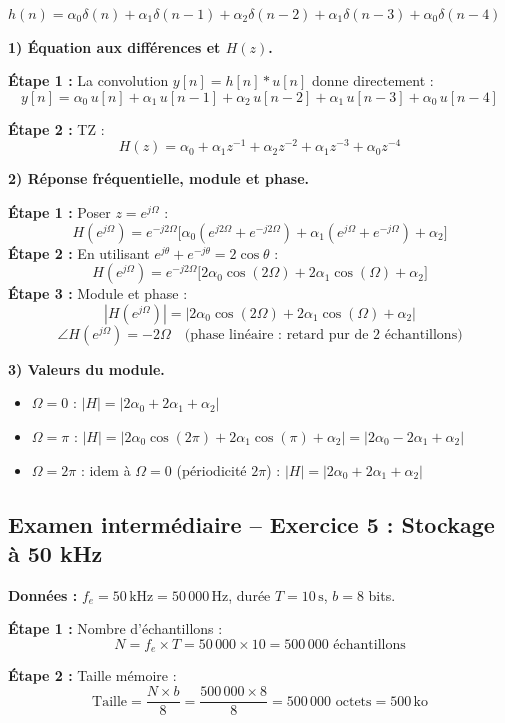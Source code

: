 \documentclass[12pt,a4paper]{article}
\newcommand{\step}[1]{\textcolor{coursbleu}{\textbf{Étape #1 :}}}
\begin{document}
\begin{tcolorbox}[corrbox, title=Correction Exercice 2 -- Filtre FIR symétrique]
$h(n) = \alpha_0\delta(n) + \alpha_1\delta(n-1) + \alpha_2\delta(n-2) + \alpha_1\delta(n-3) + \alpha_0\delta(n-4)$

\bigskip
\textbf{1) Équation aux différences et $H(z)$.}

\step{1} La convolution $y[n] = h[n] * u[n]$ donne directement :
\[
  y[n] = \alpha_0\,u[n] + \alpha_1\,u[n-1] + \alpha_2\,u[n-2] + \alpha_1\,u[n-3] + \alpha_0\,u[n-4]
\]

\step{2} TZ :
\[
  H(z) = \alpha_0 + \alpha_1 z^{-1} + \alpha_2 z^{-2} + \alpha_1 z^{-3} + \alpha_0 z^{-4}
\]

\bigskip
\textbf{2) Réponse fréquentielle, module et phase.}

\step{1} Poser $z = e^{j\Omega}$ :
\[
  H(e^{j\Omega}) = e^{-j2\Omega}\bigl[\alpha_0(e^{j2\Omega}+e^{-j2\Omega})
                  + \alpha_1(e^{j\Omega}+e^{-j\Omega}) + \alpha_2\bigr]
\]
\step{2} En utilisant $e^{j\theta}+e^{-j\theta} = 2\cos\theta$ :
\[
  H(e^{j\Omega}) = e^{-j2\Omega}\bigl[2\alpha_0\cos(2\Omega) + 2\alpha_1\cos(\Omega) + \alpha_2\bigr]
\]
\step{3} Module et phase :
\[
  |H(e^{j\Omega})| = \left|2\alpha_0\cos(2\Omega) + 2\alpha_1\cos(\Omega) + \alpha_2\right|
\]
\[
  \angle H(e^{j\Omega}) = -2\Omega \quad \text{(phase linéaire : retard pur de 2 échantillons)}
\]

\bigskip
\textbf{3) Valeurs du module.}

\begin{itemize}
  \item $\Omega = 0$ : $|H| = |2\alpha_0 + 2\alpha_1 + \alpha_2|$
  \item $\Omega = \pi$ : $|H| = |2\alpha_0\cos(2\pi) + 2\alpha_1\cos(\pi) + \alpha_2|
                              = |2\alpha_0 - 2\alpha_1 + \alpha_2|$
  \item $\Omega = 2\pi$ : idem à $\Omega = 0$ (périodicité $2\pi$) :
        $|H| = |2\alpha_0 + 2\alpha_1 + \alpha_2|$
\end{itemize}
\end{tcolorbox}

\subsection{Examen intermédiaire -- Exercice 5 : Stockage à 50 kHz}

\begin{tcolorbox}[corrbox, title=Correction Exercice 5]
\textbf{Données :} $f_e = 50\,\text{kHz} = 50\,000\,\text{Hz}$, durée $T = 10\,\text{s}$, $b = 8$ bits.

\step{1} Nombre d'échantillons :
\[
  N = f_e \times T = 50\,000 \times 10 = 500\,000 \text{ échantillons}
\]

\step{2} Taille mémoire :
\[
  \text{Taille} = \frac{N \times b}{8} = \frac{500\,000 \times 8}{8} = 500\,000 \text{ octets} = 500\,\text{ko}
\]
\end{tcolorbox}
\end{document}
